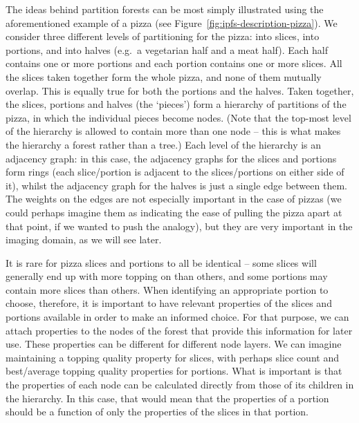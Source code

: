 The ideas behind partition forests can be most simply illustrated using the aforementioned example of a pizza (see Figure~\ref{fig:ipfs-description-pizza}). We consider three different levels of partitioning for the pizza: into slices, into portions, and into halves (e.g.~a vegetarian half and a meat half). Each half contains one or more portions and each portion contains one or more slices. All the slices taken together form the whole pizza, and none of them mutually overlap. This is equally true for both the portions and the halves. Taken together, the slices, portions and halves (the `pieces') form a hierarchy of partitions of the pizza, in which the individual pieces become nodes. (Note that the top-most level of the hierarchy is allowed to contain more than one node -- this is what makes the hierarchy a forest rather than a tree.) Each level of the hierarchy is an adjacency graph: in this case, the adjacency graphs for the slices and portions form rings (each slice/portion is adjacent to the slices/portions on either side of it), whilst the adjacency graph for the halves is just a single edge between them. The weights on the edges are not especially important in the case of pizzas (we could perhaps imagine them as indicating the ease of pulling the pizza apart at that point, if we wanted to push the analogy), but they are very important in the imaging domain, as we will see later.


It is rare for pizza slices and portions to all be identical -- some slices will generally end up with more topping on than others, and some portions may contain more slices than others. When identifying an appropriate portion to choose, therefore, it is important to have relevant properties of the slices and portions available in order to make an informed choice. For that purpose, we can attach properties to the nodes of the forest that provide this information for later use. These properties can be different for different node layers. We can imagine maintaining a topping quality property for slices, with perhaps slice count and best/average topping quality properties for portions. What is important is that the properties of each node can be calculated directly from those of its children in the hierarchy. In this case, that would mean that the properties of a portion should be a function of only the properties of the slices in that portion.

